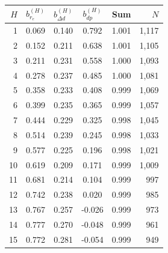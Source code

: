 \begin{tabular}{rccccr}
\toprule
$H$ & $b^{(H)}_{r_e}$ & $b^{(H)}_{\Delta d}$ & $b^{(H)}_{dp}$ & Sum & $N$ \\
\midrule
1 & 0.069 & 0.140 & 0.792 & 1.001 & 1,117 \\
2 & 0.152 & 0.211 & 0.638 & 1.001 & 1,105 \\
3 & 0.211 & 0.231 & 0.558 & 1.000 & 1,093 \\
4 & 0.278 & 0.237 & 0.485 & 1.000 & 1,081 \\
5 & 0.358 & 0.233 & 0.408 & 0.999 & 1,069 \\
6 & 0.399 & 0.235 & 0.365 & 0.999 & 1,057 \\
7 & 0.444 & 0.229 & 0.325 & 0.998 & 1,045 \\
8 & 0.514 & 0.239 & 0.245 & 0.998 & 1,033 \\
9 & 0.577 & 0.225 & 0.196 & 0.998 & 1,021 \\
10 & 0.619 & 0.209 & 0.171 & 0.999 & 1,009 \\
11 & 0.681 & 0.214 & 0.104 & 0.999 & 997 \\
12 & 0.742 & 0.238 & 0.020 & 0.999 & 985 \\
13 & 0.767 & 0.257 & -0.026 & 0.999 & 973 \\
14 & 0.777 & 0.270 & -0.048 & 0.999 & 961 \\
15 & 0.772 & 0.281 & -0.054 & 0.999 & 949 \\
\bottomrule
\end{tabular}
